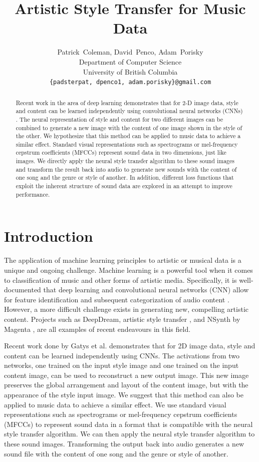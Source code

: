 \documentclass{article}
\title{Artistic Style Transfer for Music Data}
\author{
  Patrick~Coleman, David~Penco, Adam~Porisky \\
  Department of Computer Science\\
  University of British Columbia\\
  \texttt{\{padsterpat, dpenco1, adam.porisky\}@gmail.com} \\
}
\begin{document}


\maketitle

\begin{abstract}
  Recent work in the area of deep learning demonstrates that for 2-D image data, style and content can be learned independently using convolutional neural networks (CNNs) . The neural representation of style and content for two different images can be combined to generate a new image with the content of one image shown in the style of the other. We hypothesize that this method can be applied to music data to achieve a similar effect. Standard visual representations such as spectrograms or mel-frequency cepstrum coefficients (MFCCs) represent sound data in two dimensions, just like images. We directly apply the neural style transfer algorithm to these sound images and transform the result back into audio to generate new sounds with the content of one song and the genre or style of another. In addition, different loss functions that exploit the inherent structure of sound data are explored in an attempt to improve performance. 
\end{abstract}

\section{Introduction}

The application of machine learning principles to artistic or musical data is a unique and ongoing challenge. Machine learning is a powerful tool when it comes to classification of music and other forms of artistic media. Specifically, it is well-documented that deep learning and convolutional neural networks (CNN) allow for feature identification and subsequent categorization of audio content \citep{feng2014, Li2010}. However, a more difficult challenge exists in generating new, compelling artistic content. Projects such as DeepDream, artistic style transfer \citep{Gatys2015}, and NSynth by Magenta \citep{nsynth2017}, are all examples of recent endeavours in this field.

Recent work done by Gatys et al. \citep{Gatys2015} demonstrates that for 2D image data, style and content can be learned independently using CNNs. The activations from two networks, one trained on the input style image and one trained on the input content image, can be used to reconstruct a new output image. This new image preserves the global arrangement and layout of the content image, but with the appearance of the style input image. We suggest that this method can also be applied to music data to achieve a similar effect. We use standard visual representations such as spectrograms or mel-frequency cepstrum coefficients (MFCCs) to represent sound data in a format that is compatible with the neural style transfer algorithm. We can then apply the neural style transfer algorithm to these sound images. Transforming the output back into audio generates a new sound file with the content of one song and the genre or style of another.
\end{document}
